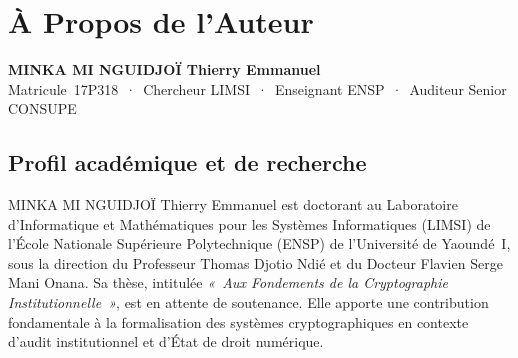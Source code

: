 
\chapter*{À Propos de l'Auteur}
\label{ann:auteur}

\begin{center}
{\large\bfseries\color{CouleurPrimaire}
MINKA MI NGUIDJOÏ Thierry Emmanuel}\\[0.5ex]
{\normalsize\color{CouleurBordInfo}
Matricule~17P318~·~Chercheur LIMSI~·~Enseignant ENSP~·~Auditeur Senior CONSUPE}
\end{center}

\bigskip

\section*{Profil académique et de recherche}

MINKA MI NGUIDJOÏ Thierry Emmanuel est doctorant au Laboratoire
d'Informatique et Mathématiques pour les Systèmes Informatiques (LIMSI)
de l'École Nationale Supérieure Polytechnique (ENSP) de l'Université de
Yaoundé~I, sous la direction du Professeur Thomas Djotio Ndié et du
Docteur Flavien Serge Mani Onana. Sa thèse, intitulée \textit{«~Aux
Fondements de la Cryptographie Institutionnelle~»}, est en attente de soutenance. 
Elle apporte une contribution fondamentale à la formalisation
des systèmes cryptographiques en contexte d'audit institutionnel et d'État
de droit numérique.

